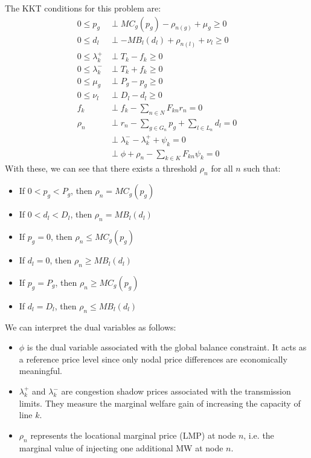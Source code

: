 \documentclass[12pt, openany]{report}
\theoremstyle{definition}
\begin{document}
The KKT conditions for this problem are:
\begin{equation}
    \begin{aligned}
        0 \leq p_g &\perp MC_g(p_g) - \rho_{n(g)} + \mu_g \geq 0\\
        0 \leq d_l &\perp -MB_l(d_l) + \rho_{n(l)} + \nu_l \geq 0\\
        0 \leq \lambda_k^+ &\perp T_k - f_k \geq 0\\
        0 \leq \lambda_k^- &\perp T_k + f_k \geq 0\\
        0 \leq \mu_g &\perp P_g - p_g \geq 0\\
        0 \leq \nu_l &\perp D_l - d_l \geq 0\\
        f_k &\perp f_k - \sum_{n \in N} F_{kn} r_n = 0\\
        \rho_n &\perp r_n - \sum_{g \in G_n} p_g + \sum_{l \in L_n} d_l = 0\\
        &\perp \lambda_k^- - \lambda_k^+ + \psi_k = 0 \\
        &\perp \phi + \rho_n - \sum_{k \in K} F_{kn} \psi_k = 0
    \end{aligned}
\end{equation}
With these, we can see that there exists a threshold $\rho_n$ for all $n$ such that:
\begin{itemize}
    \item If $0 < p_g < P_g$, then $\rho_n = MC_g(p_g)$
    \item If $0 < d_l < D_l$, then $\rho_n = MB_l(d_l)$
    \item If $p_g = 0$, then $\rho_n \leq MC_g(p_g)$
    \item If $d_l = 0$, then $\rho_n \geq MB_l(d_l)$
    \item If $p_g = P_g$, then $\rho_n \geq MC_g(p_g)$
    \item If $d_l = D_l$, then $\rho_n \leq MB_l(d_l)$     
\end{itemize}
We can interpret the dual variables as follows:
\begin{itemize}
    \item $\phi$ is the dual variable associated with the global balance constraint. It acts as a reference price level since only nodal price differences are economically meaningful.
    \item $\lambda_k^+$ and $\lambda_k^-$ are congestion shadow prices associated with the transmission limits. They measure the marginal welfare gain of increasing the capacity of line $k$.
    \item $\rho_n$ represents the locational marginal price (LMP) at node $n$, i.e. the marginal value of injecting one additional MW at node $n$.
\end{itemize}
\end{document}
